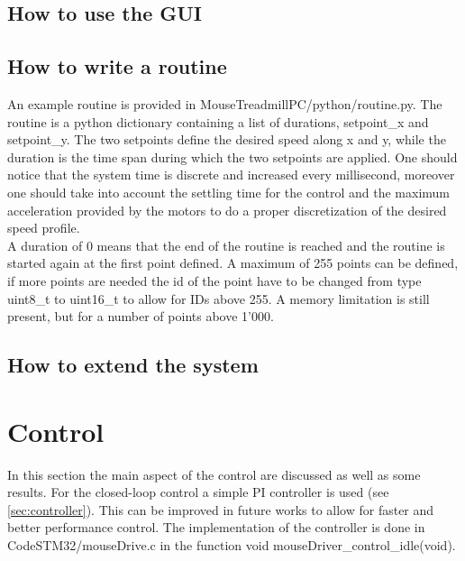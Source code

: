 \documentclass[12pt,a4paper]{article}
\begin{document}
\subsection{How to use the GUI} 
\subsection{How to write a routine}
An example routine is provided in MouseTreadmillPC/python/routine.py. The routine is a python dictionary containing a list of durations, setpoint\_x and setpoint\_y. The two setpoints define the desired speed along x and y, while the duration is the time span during which the two setpoints are applied. One should notice that the system time is discrete and increased every millisecond, moreover one should take into account the settling time for the control and the maximum acceleration provided by the motors to do a proper discretization of the desired speed profile.\\
A duration of 0 means that the end of the routine is reached and the routine is started again at the first point defined. A maximum of 255 points can be defined, if more points are needed the id of the point have to be changed from type uint8\_t to uint16\_t to allow for IDs above 255. A memory limitation is still present, but for a number of points above 1'000.
\subsection{How to extend the system}

\section{Control} \label{sec:control}
In this section the main aspect of the control are discussed as well as some results.
For the closed-loop control a simple PI controller is used (see \ref{sec:controller}). This can be improved in future works to allow for faster and better performance control. The implementation of the controller is done in CodeSTM32/mouseDrive.c in the function void mouseDriver\_control\_idle(void). 
\end{document}
